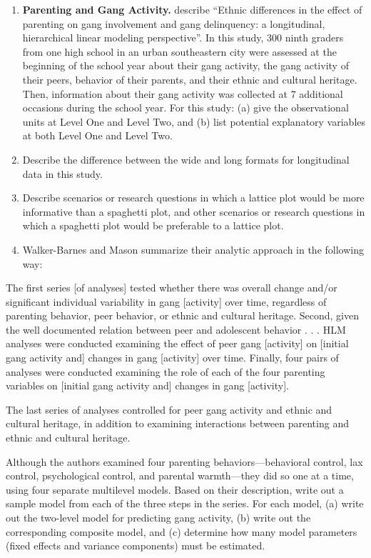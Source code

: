 \documentclass[
]{krantz}
\renewenvironment{quote}{\begin{VF}}{\end{VF}}
\begin{document}
\begin{enumerate}
\def\labelenumi{\arabic{enumi}.}
\item
  \textbf{Parenting and Gang Activity.} \citet{Walker-Barnes2001} describe ``Ethnic differences in the effect of parenting on gang involvement and gang delinquency: a longitudinal, hierarchical linear modeling perspective''. In this study, 300 ninth graders from one high school in an urban southeastern city were assessed at the beginning of the school year about their gang activity, the gang activity of their peers, behavior of their parents, and their ethnic and cultural heritage. Then, information about their gang activity was collected at 7 additional occasions during the school year. For this study: (a) give the observational units at Level One and Level Two, and (b) list potential explanatory variables at both Level One and Level Two.
\item
  Describe the difference between the wide and long formats for longitudinal data in this study.
\item
  Describe scenarios or research questions in which a lattice plot would be more informative than a spaghetti plot, and other scenarios or research questions in which a spaghetti plot would be preferable to a lattice plot.
\item
  Walker-Barnes and Mason summarize their analytic approach in the following way:
\end{enumerate}

\begin{quote}
The first series {[}of analyses{]} tested whether there was overall change and/or significant individual variability in gang {[}activity{]} over time, regardless of parenting behavior, peer behavior, or ethnic and cultural heritage. Second, given the well documented relation between peer and adolescent behavior . . . HLM analyses were conducted examining the effect of peer gang {[}activity{]} on {[}initial gang activity and{]} changes in gang {[}activity{]} over time. Finally, four pairs of analyses were conducted examining the role of each of the four parenting variables on {[}initial gang activity and{]} changes in gang {[}activity{]}.
\end{quote}

The last series of analyses controlled for peer gang activity and ethnic and cultural heritage, in addition to examining interactions between parenting and ethnic and cultural heritage.

Although the authors examined four parenting behaviors---behavioral control, lax control, psychological control, and parental warmth---they did so one at a time, using four separate multilevel models. Based on their description, write out a sample model from each of the three steps in the series. For each model, (a) write out the two-level model for predicting gang activity, (b) write out the corresponding composite model, and (c) determine how many model parameters (fixed effects and variance components) must be estimated.
\end{document}
